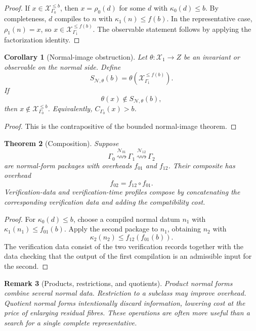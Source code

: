 \documentclass[11pt]{article}
\newtheorem{theorem}{Theorem}[section]
\newtheorem{corollary}[theorem]{Corollary}
\newtheorem{remark}[theorem]{Remark}
\begin{document}
\begin{proof}
If \(x\in\mathcal X_{\Gamma_0}^{\leq b}\), then \(x=\rho_0(d)\) for some \(d\) with \(\kappa_0(d)\leq b\). By completeness, \(d\) compiles to \(n\) with \(\kappa_1(n)\leq f(b)\). In the representative case, \(\rho_1(n)=x\), so \(x\in\mathcal X_{\Gamma_1}^{\leq f(b)}\). The observable statement follows by applying the factorization identity.
\end{proof}

\begin{corollary}[Normal-image obstruction]
Let \(\theta:\mathcal X_1\to Z\) be an invariant or observable on the normal side. Define
\[
S_{\mathcal N,\theta}(b)=\theta(\mathcal X_{\Gamma_1}^{\leq f(b)}).
\]
If
\[
\theta(x)\notin S_{\mathcal N,\theta}(b),
\]
then \(x\notin\mathcal X_{\Gamma_0}^{\leq b}\). Equivalently, \(C_{\Gamma_0}(x)>b\).
\end{corollary}

\begin{proof}
This is the contrapositive of the bounded normal-image theorem.
\end{proof}

\begin{theorem}[Composition]
Suppose
\[
\Gamma_0
\overset{\mathcal N_{01}}{\rightsquigarrow}
\Gamma_1
\overset{\mathcal N_{12}}{\rightsquigarrow}
\Gamma_2
\]
are normal-form packages with overheads \(f_{01}\) and \(f_{12}\). Their composite has overhead
\[
f_{02}=f_{12}\circ f_{01}.
\]
Verification-data and verification-time profiles compose by concatenating the corresponding verification data and adding the compatibility cost.
\end{theorem}

\begin{proof}
For \(\kappa_0(d)\leq b\), choose a compiled normal datum \(n_1\) with \(\kappa_1(n_1)\leq f_{01}(b)\). Apply the second package to \(n_1\), obtaining \(n_2\) with
\[
\kappa_2(n_2)\leq f_{12}(f_{01}(b)).
\]
The verification data consist of the two verification records together with the data checking that the output of the first compilation is an admissible input for the second.
\end{proof}

\begin{remark}[Products, restrictions, and quotients]
Product normal forms combine several normal data. Restriction to a subclass may improve overhead. Quotient normal forms intentionally discard information, lowering cost at the price of enlarging residual fibres. These operations are often more useful than a search for a single complete representative.
\end{remark}
\end{document}
